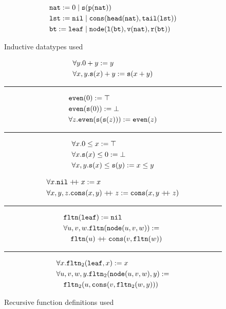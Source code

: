 
\begin{figure}
\begin{mdframed}
	$$\begin{aligned}&\mathtt{nat}:=0 \mid \mathtt{s}(\mathtt{p}(\mathtt{nat}))\\
	&\mathtt{lst}:=\mathtt{nil}\mid\mathtt{cons}(\mathtt{head}(\mathtt{nat}),\mathtt{tail}(\mathtt{lst}))\\
	&\mathtt{bt}:=\mathtt{leaf} \mid \mathtt{node}(\mathtt{l}(\mathtt{bt}),\mathtt{v}(\mathtt{nat}),\mathtt{r}(\mathtt{bt}))\end{aligned}$$
\end{mdframed}
\caption{Inductive datatypes used}
\label{fig:datatypes}
\end{figure}
\begin{figure}
\begin{minipage}[t]{0.4\textwidth}
	$$\begin{aligned}&\forall y.0+y:=y\\
	&\forall x,y.\mathtt{s}(x)+y:=\mathtt{s}(x+y)\\
	\end{aligned}$$
	\hrule
	$$\begin{aligned}&\mathtt{even}(0):=\top\\
	&\mathtt{even}(\mathtt{s}(0)):=\bot\\
	&\forall z.\mathtt{even}(\mathtt{s}(\mathtt{s}(z))):=\mathtt{even}(z)\\
	\end{aligned}$$
	\hrule
	$$\begin{aligned}&\forall x.0\leq x:=\top\\
	&\forall x.\mathtt{s}(x)\leq 0:=\bot\\
	&\forall x,y.\mathtt{s}(x)\leq \mathtt{s}(y):=x\leq y\\
	\end{aligned}$$
\end{minipage}
\begin{minipage}[t]{0.5\textwidth}
	$$\begin{aligned}&\forall x.\mathtt{nil}\mathrel{ +\hspace{-1mm}+ } x:=x\\
	&\forall x,y,z.\mathtt{cons}(x,y)\mathrel{ +\hspace{-1mm}+ } z:=\mathtt{cons}(x,y\mathrel{ +\hspace{-1mm}+ } z)\\
	\end{aligned}$$
	\hrule
	$$\begin{aligned}
	&\mathtt{fltn}(\mathtt{leaf}):=\mathtt{nil}\\
	&\forall u,v,w.\mathtt{fltn}(\mathtt{node}(u,v,w)):=\\&\quad\mathtt{fltn}(u)\mathrel{ +\hspace{-1mm}+ }\mathtt{cons}(v,\mathtt{fltn}(w))
	\end{aligned}$$
	\hrule
	$$\begin{aligned}
	&\forall x.\mathtt{fltn}_2(\mathtt{leaf},x):=x\\
	&\forall u,v,w,y.\mathtt{fltn}_2(\mathtt{node}(u,v,w),y):=\\&\quad\mathtt{fltn}_2(u,\mathtt{cons}(v,\mathtt{fltn}_2(w,y)))
	\end{aligned}$$
\end{minipage}
\caption{Recursive function definitions used}
\label{fig:functions}
\end{figure}

